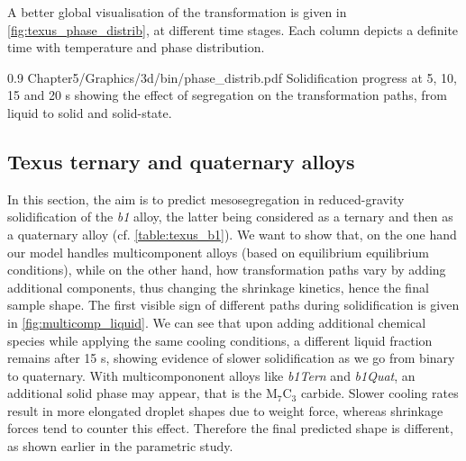 A better global visualisation of the transformation is given in \cref{fig:texus_phase_distrib}, at different time stages.
Each column depicts a definite time with temperature and phase distribution. 


\begin{figureth}
{0.9}
{Chapter5/Graphics/3d/bin/phase_distrib.pdf}
{Solidification progress at 5, 10, 15 and 20 s showing the effect of segregation on the transformation paths, from liquid to solid and solid-state.}
\label{fig:texus_phase_distrib}
\end{figureth}


\subsection{Texus ternary and quaternary alloys}

In this section, the aim is to predict mesosegregation in reduced-gravity solidification of the \emph{b1} alloy, the latter being considered 
as a ternary and then as a quaternary alloy (cf. \cref{table:texus_b1}). 
We want to show that, on the one hand our model handles multicomponent alloys (based on equilibrium equilibrium conditions), while
on the other hand, how transformation paths vary by adding additional components, thus changing the shrinkage kinetics, hence the final sample shape.
The first visible sign of different paths during solidification is given in \cref{fig:multicomp_liquid}. We can see that upon adding
additional chemical species while applying the same cooling conditions, a different liquid fraction remains after 15 s, showing evidence 
of slower solidification as we go from binary to quaternary. With multicompononent alloys like \emph{b1Tern} and \emph{b1Quat}, an additional solid
phase may appear, that is the M$_7$C$_3$ carbide.
Slower cooling rates result in more elongated droplet shapes due to weight force, whereas shrinkage forces tend to counter this effect.
Therefore the final predicted shape is different, as shown earlier in the parametric study.

